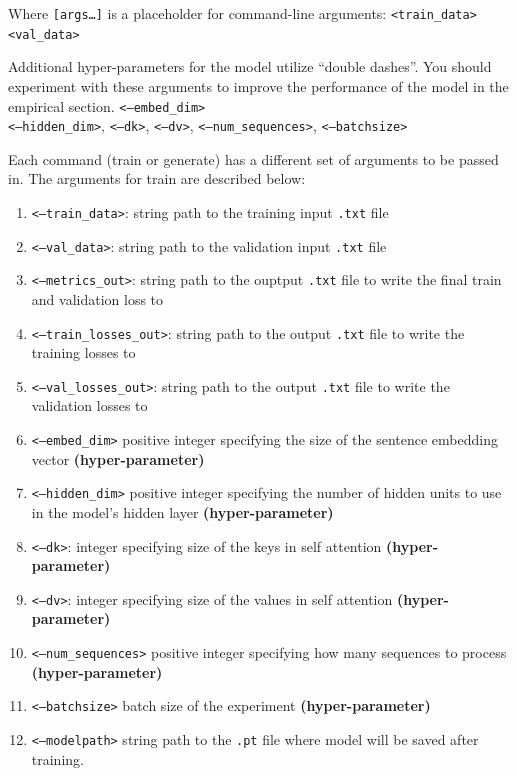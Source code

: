 \documentclass[11pt,addpoints,answers]{exam}
\begin{document}
Where \texttt{[args\dots]} is a placeholder for command-line arguments: \texttt{<train\_data>} \texttt{<val\_data>}

Additional hyper-parameters for the model utilize ``double dashes''. You should experiment with these arguments to improve the performance of the model in the empirical section. \texttt{<--embed\_dim>} \\ \texttt{<--hidden\_dim>}, \texttt{<--dk>}, \texttt{<--dv>}, \texttt{<--num\_sequences>}, \texttt{<--batch\textunderscore size>}

Each command (train or generate) has a different set of arguments to be passed in.
The arguments for train are described below:
\begin{enumerate}
    \item \texttt{<--train\_data>}: string path to the training input \texttt{.txt} file 
    \item \texttt{<--val\_data>}: string path to the validation input \texttt{.txt} file 
    \item \texttt{<--metrics\_out>}: string path to the ouptput \texttt{.txt} file to write the final train and validation loss to
    \item \texttt{<--train\_losses\_out>}: string path to the output \texttt{.txt} file to write the training losses to
    \item \texttt{<--val\_losses\_out>}: string path to the output \texttt{.txt} file to write the validation losses to
     \item \texttt{<--embed\_dim>} positive integer specifying the size of the sentence embedding vector \textbf{(hyper-parameter)}
    \item \texttt{<--hidden\_dim>} positive integer specifying the number of hidden units to use in the model's hidden layer \textbf{(hyper-parameter)}
    \item \texttt{<--dk>}: integer specifying size of the keys in self attention \textbf{(hyper-parameter)}
    \item \texttt{<--dv>}: integer specifying size of the values in self attention \textbf{(hyper-parameter)}
    \item \texttt{<--num\_sequences>} positive integer specifying how many sequences to process \textbf{(hyper-parameter)}
    \item \texttt{<--batch\textunderscore size>} batch size of the experiment \textbf{(hyper-parameter)}
    \item \texttt{<--model\textunderscore path>} string path to the \texttt{.pt} file where model will be saved after training.
\end{enumerate}
\end{document}
